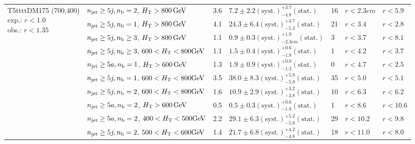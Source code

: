 \begin{table}[h!]
\begin{tabular}{ lllllll }
\multirow{10}{*}{\parbox[t]{2.3cm}{T5ttttDM175 (700,400)\\exp.: $r<1.0$\\obs.: $r<1.35$}}
 & $n_{\mathrm{jet}} \geq5j,n_{\text{b}} =2$, $\mbox{$H_\text{T}$} > 800 \, \mathrm{GeV}$ & 3.6 & $7.2 \pm 2.2 \mathrm{(syst.)} ^{+3.7}_{-4.8} \mathrm{(stat.)}$ & 16 & $r < 2.3cm$ & $r < 5.9$\\ 
 & $n_{\mathrm{jet}} \geq5j,n_{\text{b}} =1$, $\mbox{$H_\text{T}$} > 800 \, \mathrm{GeV}$ & 4.1 & $24.3 \pm 6.4 \mathrm{(syst.)} ^{+4.7}_{-5.3} \mathrm{(stat.)}$ & 21 & $r < 3.4$ & $r < 2.8$\\ 
 & $n_{\mathrm{jet}} \geq5j,n_{\text{b}} \geq3$, $\mbox{$H_\text{T}$} > 800 \, \mathrm{GeV}$ & 1.1 & $0.9 \pm 0.3 \mathrm{(syst.)} ^{+1.9}_{-2.3cm} \mathrm{(stat.)}$ & 3 & $r < 3.7$ & $r < 8.1$\\ 
 & $n_{\mathrm{jet}} \geq5j,n_{\text{b}} \geq3$, $600 < \mbox{$H_\text{T}$} < 800 \mathrm{GeV}$ & 1.1 & $1.5 \pm 0.4 \mathrm{(syst.)} ^{+0.6}_{-1.8} \mathrm{(stat.)}$ & 1 & $r < 4.2$ & $r < 3.7$\\ 
 & $n_{\mathrm{jet}} \geq5a,n_{\text{b}} =1$, $\mbox{$H_\text{T}$} > 600 \, \mathrm{GeV}$ & 1.3 & $1.9 \pm 0.9 \mathrm{(syst.)} ^{+0.0}_{-1.3} \mathrm{(stat.)}$ & 0 & $r < 4.7$ & $r < 2.5$\\ 
 & $n_{\mathrm{jet}} \geq5j,n_{\text{b}} =1$, $600 < \mbox{$H_\text{T}$} < 800 \mathrm{GeV}$ & 3.5 & $38.0 \pm 8.3 \mathrm{(syst.)} ^{+5.9}_{-5.9} \mathrm{(stat.)}$ & 35 & $r < 5.0$ & $r < 5.1$\\ 
 & $n_{\mathrm{jet}} \geq5j,n_{\text{b}} =2$, $600 < \mbox{$H_\text{T}$} < 800 \mathrm{GeV}$ & 1.6 & $10.9 \pm 2.9 \mathrm{(syst.)} ^{+3.2}_{-3.8} \mathrm{(stat.)}$ & 10 & $r < 6.3$ & $r < 6.2$\\ 
 & $n_{\mathrm{jet}} \geq5a,n_{\text{b}} =2$, $\mbox{$H_\text{T}$} > 600 \, \mathrm{GeV}$ & 0.5 & $0.5 \pm 0.3 \mathrm{(syst.)} ^{+0.6}_{-1.8} \mathrm{(stat.)}$ & 1 & $r < 8.6$ & $r < 10.6$\\ 
 & $n_{\mathrm{jet}} \geq5a,n_{\text{b}} =2$, $400 < \mbox{$H_\text{T}$} < 500 \mathrm{GeV}$ & 2.2 & $29.1 \pm 6.3 \mathrm{(syst.)} ^{+5.2}_{-5.8} \mathrm{(stat.)}$ & 29 & $r < 10.2$ & $r < 9.8$\\ 
 & $n_{\mathrm{jet}} \geq5j,n_{\text{b}} =2$, $500 < \mbox{$H_\text{T}$} < 600 \mathrm{GeV}$ & 1.4 & $21.7 \pm 6.8 \mathrm{(syst.)} ^{+4.2}_{-4.8} \mathrm{(stat.)}$ & 18 & $r < 11.0$ & $r < 8.0$\\ \hline
    \hline
  \end{tabular}
\end{table}


